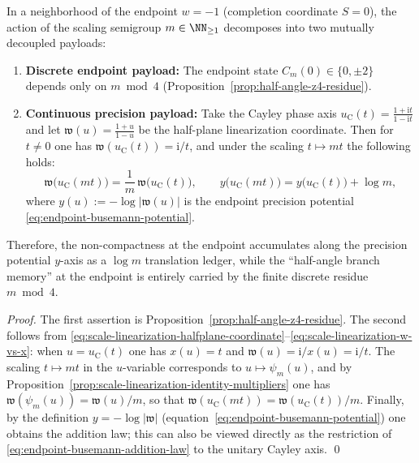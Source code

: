 \begin{proposition}\label{prop:endpoint-orthogonal-decomposition-z4-Rplus}
In a neighborhood of the endpoint \(w=-1\) (completion coordinate \(S=0\)), the action of the scaling semigroup \(m\in\NN_{\ge 1}\) decomposes into two mutually decoupled payloads:
\begin{enumerate}
  \item \textbf{Discrete endpoint payload:} The endpoint state \(C_m(0)\in\{0,\pm 2\}\) depends only on \(m\bmod 4\) (Proposition~\ref{prop:half-angle-z4-residue}).
  \item \textbf{Continuous precision payload:} Take the Cayley phase axis \(u_{\mathrm C}(t)=\frac{1+\mathrm{i}t}{1-\mathrm{i}t}\) and let \(\mathfrak{w}(u)=\frac{1+u}{1-u}\) be the half-plane linearization coordinate.
  Then for \(t\neq 0\) one has \(\mathfrak{w}(u_{\mathrm C}(t))=\mathrm{i}/t\), and under the scaling \(t\mapsto mt\) the following holds:
  \[
  \mathfrak{w}\!\bigl(u_{\mathrm C}(mt)\bigr)=\frac{1}{m}\,\mathfrak{w}\!\bigl(u_{\mathrm C}(t)\bigr),
  \qquad
  y\!\bigl(u_{\mathrm C}(mt)\bigr)=y\!\bigl(u_{\mathrm C}(t)\bigr)+\log m,
  \]
  where \(y(u):=-\log|\mathfrak{w}(u)|\) is the endpoint precision potential \eqref{eq:endpoint-busemann-potential}.
\end{enumerate}
Therefore, the non-compactness at the endpoint accumulates along the precision potential \(y\)-axis as a \(\log m\) translation ledger, while the ``half-angle branch memory'' at the endpoint is entirely carried by the finite discrete residue \(m\bmod 4\).
\end{proposition}
\begin{proof}
The first assertion is Proposition~\ref{prop:half-angle-z4-residue}.
The second follows from \eqref{eq:scale-linearization-halfplane-coordinate}--\eqref{eq:scale-linearization-w-vs-x}: when \(u=u_{\mathrm C}(t)\) one has \(x(u)=t\) and \(\mathfrak{w}(u)=\mathrm{i}/x(u)=\mathrm{i}/t\).
The scaling \(t\mapsto mt\) in the \(u\)-variable corresponds to \(u\mapsto\psi_m(u)\), and by Proposition~\ref{prop:scale-linearization-identity-multipliers} one has \(\mathfrak{w}(\psi_m(u))=\mathfrak{w}(u)/m\), so that \(\mathfrak{w}(u_{\mathrm C}(mt))=\mathfrak{w}(u_{\mathrm C}(t))/m\).
Finally, by the definition \(y=-\log|\mathfrak{w}|\) (equation~\eqref{eq:endpoint-busemann-potential}) one obtains the addition law; this can also be viewed directly as the restriction of \eqref{eq:endpoint-busemann-addition-law} to the unitary Cayley axis. \qed
\end{proof}


